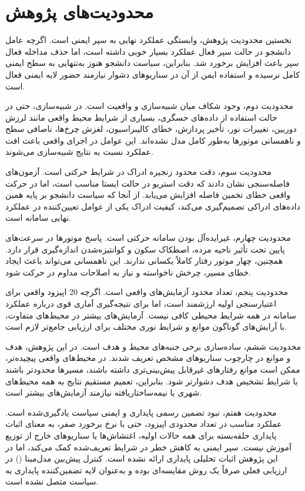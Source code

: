 \section{محدودیت‌های پژوهش}
\label{sec:research_limitations}

نخستین محدودیت پژوهش، وابستگی عملکرد نهایی به سپر ایمنی است. اگرچه عامل دانشجو در حالت سپر فعال عملکرد بسیار خوبی داشته است، اما حذف مداخله فعال سپر باعث افزایش برخورد شد. بنابراین، سیاست دانشجو هنوز به‌تنهایی به سطح ایمنی کامل نرسیده و استفاده ایمن از آن در سناریوهای دشوار نیازمند حضور لایه ایمنی فعال است.

محدودیت دوم، وجود شکاف میان شبیه‌سازی و واقعیت است. در شبیه‌سازی، حتی در حالت استفاده از داده‌های حسگری، بسیاری از شرایط محیط واقعی مانند لرزش دوربین، تغییرات نور، تأخیر پردازش، خطای کالیبراسیون، لغزش چرخ‌ها، ناصافی سطح و ناهمسانی موتورها به‌طور کامل مدل نشده‌اند. این عوامل در اجرای واقعی باعث افت عملکرد نسبت به نتایج شبیه‌سازی می‌شوند.

محدودیت سوم، دقت محدود زنجیره ادراک در شرایط حرکتی است. آزمون‌های فاصله‌سنجی نشان دادند که دقت استریو در حالت ایستا مناسب است، اما در حرکت واقعی خطای تخمین فاصله افزایش می‌یابد. از آنجا که سیاست دانشجو بر پایه همین داده‌های ادراکی تصمیم‌گیری می‌کند، کیفیت ادراک یکی از عوامل تعیین‌کننده در عملکرد نهایی سامانه است.

محدودیت چهارم، غیرایده‌آل بودن سامانه حرکتی است. پاسخ موتورها در سرعت‌های پایین تحت تأثیر ناحیه مرده، اصطکاک سکون و کوانتیزه‌شدن اندازه‌گیری قرار دارد. همچنین، چهار موتور رفتار کاملاً یکسانی ندارند. این ناهمسانی می‌تواند باعث ایجاد خطای مسیر، چرخش ناخواسته و نیاز به اصلاحات مداوم در حرکت شود.

محدودیت پنجم، تعداد محدود آزمایش‌های واقعی است. اگرچه 20 اپیزود واقعی برای اعتبارسنجی اولیه ارزشمند است، اما برای نتیجه‌گیری آماری قوی درباره عملکرد سامانه در همه شرایط محیطی کافی نیست. آزمایش‌های بیشتر در محیط‌های متفاوت، با آرایش‌های گوناگون موانع و شرایط نوری مختلف برای ارزیابی جامع‌تر لازم است.

محدودیت ششم، ساده‌سازی برخی جنبه‌های محیط و هدف است. در این پژوهش، هدف و موانع در چارچوب سناریوهای مشخص تعریف شدند. در محیط‌های واقعی پیچیده‌تر، ممکن است موانع رفتارهای غیرقابل پیش‌بینی‌تری داشته باشند، مسیرها محدودتر باشند یا شرایط تشخیص هدف دشوارتر شود. بنابراین، تعمیم مستقیم نتایج به همه محیط‌های شهری یا نیمه‌ساختاریافته نیازمند آزمایش‌های بیشتر است.

محدودیت هفتم، نبود تضمین رسمی پایداری و ایمنی سیاست یادگیری‌شده است. عملکرد مناسب در تعداد محدودی اپیزود، حتی با نرخ برخورد صفر، به معنای اثبات پایداری حلقه‌بسته برای همه حالات اولیه، اغتشاش‌ها یا سناریوهای خارج از توزیع آموزش نیست. سپر ایمنی به کاهش خطر در شرایط تعریف‌شده کمک می‌کند، اما در این پژوهش اثبات تحلیلی پایداری ارائه نشده است. کنترل پیش‌بین مدل‌مبنا () در ارزیابی فعلی صرفاً یک روش مقایسه‌ای بوده و به‌عنوان لایه تضمین‌کننده پایداری به سیاست متصل نشده است.

